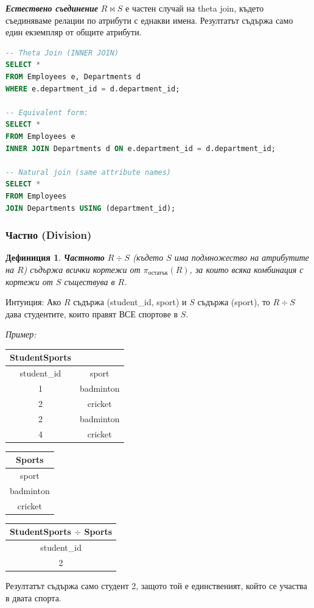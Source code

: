 \documentclass{scrartcl}
\newtheorem{definition}{Дефиниция}
\begin{document}
\begin{FlushLeft}
\textbf{\textit{Естествено съединение}} $R \bowtie S$ е частен случай на theta join, където съединяваме релации по атрибути с еднакви имена. Резултатът съдържа само един екземпляр от общите атрибути.

\begin{lstlisting}[language=SQL, caption=JOIN operations]
-- Theta Join (INNER JOIN)
SELECT *
FROM Employees e, Departments d
WHERE e.department_id = d.department_id;

-- Equivalent form:
SELECT *
FROM Employees e
INNER JOIN Departments d ON e.department_id = d.department_id;

-- Natural join (same attribute names)
SELECT *
FROM Employees
JOIN Departments USING (department_id);
\end{lstlisting}

\subsubsection{Частно (Division)}

\begin{definition}
\textbf{\textit{Частното}} $R \div S$ (където $S$ има подмножество на атрибутите на $R$) съдържа всички кортежи от $\pi_{\text{остатък}}(R)$, за които всяка комбинация с кортежи от $S$ съществува в $R$.
\end{definition}

Интуиция: Ако $R$ съдържа (student\_id, sport) и $S$ съдържа (sport), то $R \div S$ дава студентите, които правят ВСЕ спортове в $S$.

\textit{Пример:}

\begin{center}
\begin{tabular}{|c|c|}
\hline
\textbf{StudentSports} & \\
\hline
student\_id & sport \\
\hline
1 & badminton \\
2 & cricket \\
2 & badminton \\
4 & cricket \\
\hline
\end{tabular}
\hspace{1cm}
\begin{tabular}{|c|}
\hline
\textbf{Sports} \\
\hline
sport \\
\hline
badminton \\
cricket \\
\hline
\end{tabular}
\hspace{1cm}
\begin{tabular}{|c|}
\hline
\textbf{StudentSports} $\div$ \textbf{Sports} \\
\hline
student\_id \\
\hline
2 \\
\hline
\end{tabular}
\end{center}

Резултатът съдържа само студент 2, защото той е единственият, който се участва в двата спорта.

\end{FlushLeft}
\end{document}
